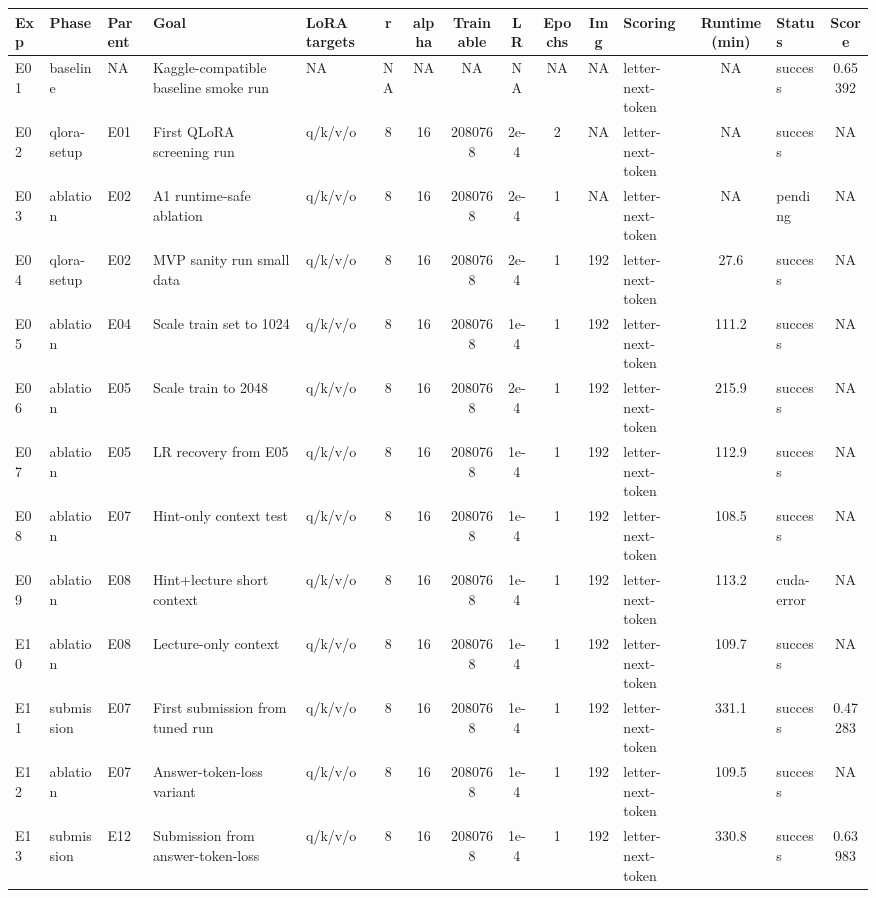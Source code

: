 \begin{table}[p]
\centering
\tiny
\setlength{\tabcolsep}{2pt}
\begin{tabular}{l l l p{2.8cm} p{2.5cm} c c c c c c p{1.8cm} c l c}
\hline
Exp & Phase & Parent & Goal & LoRA targets & r & alpha & Trainable & LR & Epochs & Img & Scoring & Runtime(min) & Status & Score \\
\hline
E01 & baseline & NA & Kaggle-compatible baseline smoke run & NA & NA & NA & NA & NA & NA & NA & letter-next-token & NA & success & 0.65392 \\
E02 & qlora-setup & E01 & First QLoRA screening run & q/k/v/o & 8 & 16 & 2080768 & 2e-4 & 2 & NA & letter-next-token & NA & success & NA \\
E03 & ablation & E02 & A1 runtime-safe ablation & q/k/v/o & 8 & 16 & 2080768 & 2e-4 & 1 & NA & letter-next-token & NA & pending & NA \\
E04 & qlora-setup & E02 & MVP sanity run small data & q/k/v/o & 8 & 16 & 2080768 & 2e-4 & 1 & 192 & letter-next-token & 27.6 & success & NA \\
E05 & ablation & E04 & Scale train set to 1024 & q/k/v/o & 8 & 16 & 2080768 & 1e-4 & 1 & 192 & letter-next-token & 111.2 & success & NA \\
E06 & ablation & E05 & Scale train to 2048 & q/k/v/o & 8 & 16 & 2080768 & 2e-4 & 1 & 192 & letter-next-token & 215.9 & success & NA \\
E07 & ablation & E05 & LR recovery from E05 & q/k/v/o & 8 & 16 & 2080768 & 1e-4 & 1 & 192 & letter-next-token & 112.9 & success & NA \\
E08 & ablation & E07 & Hint-only context test & q/k/v/o & 8 & 16 & 2080768 & 1e-4 & 1 & 192 & letter-next-token & 108.5 & success & NA \\
E09 & ablation & E08 & Hint+lecture short context & q/k/v/o & 8 & 16 & 2080768 & 1e-4 & 1 & 192 & letter-next-token & 113.2 & cuda-error & NA \\
E10 & ablation & E08 & Lecture-only context & q/k/v/o & 8 & 16 & 2080768 & 1e-4 & 1 & 192 & letter-next-token & 109.7 & success & NA \\
E11 & submission & E07 & First submission from tuned run & q/k/v/o & 8 & 16 & 2080768 & 1e-4 & 1 & 192 & letter-next-token & 331.1 & success & 0.47283 \\
E12 & ablation & E07 & Answer-token-loss variant & q/k/v/o & 8 & 16 & 2080768 & 1e-4 & 1 & 192 & letter-next-token & 109.5 & success & NA \\
E13 & submission & E12 & Submission from answer-token-loss & q/k/v/o & 8 & 16 & 2080768 & 1e-4 & 1 & 192 & letter-next-token & 330.8 & success & 0.63983 \\

\end{tabular}
\end{table}
